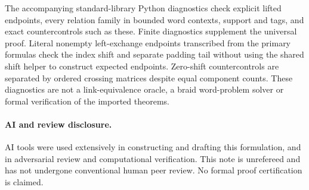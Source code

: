 \documentclass[11pt]{article}
\begin{document}
The accompanying standard-library Python diagnostics check explicit lifted
endpoints, every relation family in bounded word contexts, support and tags,
and exact countercontrols such as these. Finite diagnostics supplement the
universal proof. Literal nonempty left-exchange endpoints transcribed from the
primary formulas check the index shift and separate padding tail without using
the shared shift helper to construct expected endpoints. Zero-shift
countercontrols are separated by ordered crossing matrices despite equal
component counts. These diagnostics are not a link-equivalence oracle, a braid word-problem
solver or formal verification of the imported theorems.

\paragraph{AI and review disclosure.}
AI tools were used extensively in constructing and drafting this formulation,
and in adversarial review and computational verification. This note is
unrefereed and has not undergone conventional human peer review. No formal
proof certification is claimed.
\end{document}
